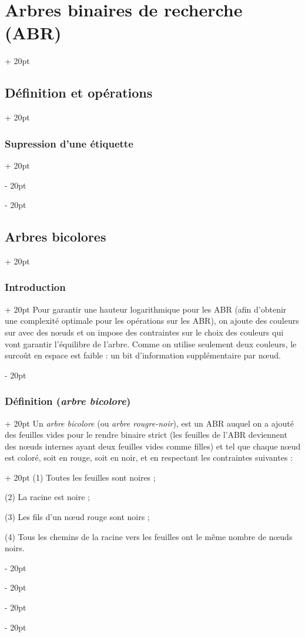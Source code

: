 \documentclass[a4paper, 12pt, twoside]{article}
\newcommand{\ind}[1][20pt]{\advance\leftskip + #1}
\newcommand{\deind}[1][20pt]{\advance\leftskip - #1}
\newenvironment{indt}[2][20pt]{#2 \par \ind[#1]}{\par \deind} %
\begin{document}
\begin{indt}{\section{Arbres binaires de recherche (ABR)}}
\begin{indt}{\subsection{Définition et opérations}}
\begin{indt}{\subsubsection{Supression d'une étiquette}}
            \end{indt}
        \end{indt}
        
        \begin{indt}{\subsection{Arbres bicolores}}
            \label{2.2}
            
            \begin{indt}{\subsubsection{Introduction}}
                Pour garantir une hauteur logarithmique pour les ABR (afin d'obtenir une complexité optimale pour les opérations sur les ABR), on ajoute des couleurs sur avec des n\oe uds et on impose des contraintes sur le choix des couleurs qui vont garantir l'équilibre de l'arbre. Comme on utilise seulement deux couleurs, le surcoût en espace est faible : un bit d'information supplémentaire par n\oe ud.
            \end{indt}
            
            \vspace{12pt}
            
            \begin{indt}{\subsubsection{Définition (\textit{arbre bicolore})}}
                \label{2.2.2}
                \begin{indt}{Un \textit{arbre bicolore} (ou \textit{arbre rougre-noir}), est un ABR auquel on a ajouté des feuilles vides pour le rendre binaire strict (les feuilles de l'ABR deviennent des n\oe uds internes ayant deux feuilles vides comme filles) et tel que chaque n\oe ud est coloré, soit en rouge, soit en noir, et en respectant les contraintes suivantes :}
                    (1) Toutes les feuilles sont noires ;
                    
                    (2) La racine est noire ;
                    
                    (3) Les fils d'un n\oe ud rouge sont noirs ;
                    
                    (4) Tous les chemins de la racine vers les feuilles ont le même nombre de n\oe uds noirs.
                \end{indt}
            \end{indt}
            

\end{indt}
\end{indt}
\end{document}
